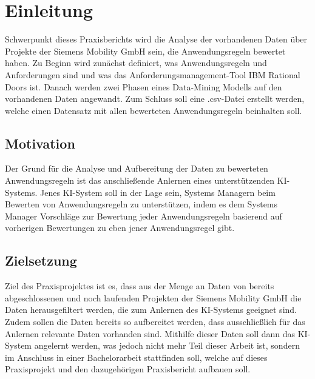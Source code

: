 \chapter{Einleitung}
\label{chap:einleitung}

Schwerpunkt dieses Praxisberichts wird die Analyse der vorhandenen Daten über Projekte der Siemens Mobility GmbH sein, die Anwendungsregeln bewertet haben. Zu Beginn wird zunächst definiert, was
Anwendungsregeln und Anforderungen sind und was das Anforderungsmanagement-Tool IBM Rational Doors ist. Danach werden zwei Phasen eines Data-Mining Modells auf den vorhandenen Daten angewandt. Zum Schluss
soll eine .csv-Datei erstellt werden, welche einen Datensatz mit allen bewerteten Anwendungsregeln beinhalten soll. 

\section{Motivation}
\label{chap:Motivation}
Der Grund für die Analyse und Aufbereitung der Daten zu bewerteten Anwendungsregeln ist das anschließende Anlernen eines unterstützenden KI-Systems. Jenes KI-System soll in der Lage sein,
Systems Managern beim Bewerten von Anwendungsregeln zu unterstützen, indem es dem Systems Manager Vorschläge zur Bewertung jeder Anwendungsregeln basierend auf vorherigen Bewertungen zu
eben jener Anwendungsregel gibt.

\section{Zielsetzung}
\label{chap:Zielsetzung}
Ziel des Praxisprojektes ist es, dass aus der Menge an Daten von bereits abgeschlossenen und noch laufenden Projekten der Siemens Mobility GmbH die Daten herausgefiltert werden, die 
zum Anlernen des KI-Systems geeignet sind. Zudem sollen die Daten bereits so aufbereitet werden, dass ausschließlich für das Anlernen relevante Daten vorhanden sind. Mithilfe dieser Daten
soll dann das KI-System angelernt werden, was jedoch nicht mehr Teil dieser Arbeit ist, sondern im Anschluss in einer Bachelorarbeit stattfinden soll, welche auf dieses Praxisprojekt und den 
dazugehörigen Praxisbericht aufbauen soll.

